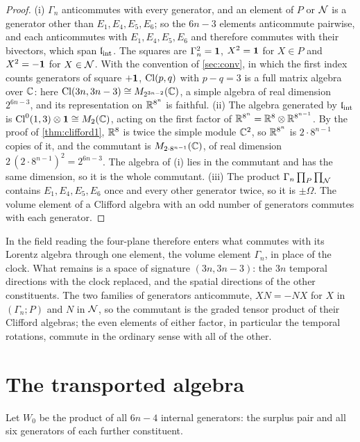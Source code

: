 \begin{proof}
(i) $\Gamma_n$ anticommutes with every generator, and an element of $P$ or $\mathcal N$ is a generator other than $E_1,E_4,E_5,E_6$; so the $6n-3$
elements anticommute pairwise, and each anticommutes with $E_1,E_4,E_5,E_6$ and therefore commutes with their bivectors, which span
$\mathfrak l_{\rm int}$. The squares are $\Gamma_n^2=\mathbf 1$, $X^2=\mathbf 1$ for $X\in P$ and $X^2=-\mathbf 1$ for $X\in\mathcal N$. With the convention of \cref{sec:conv}, in
which the first index counts generators of square $+\mathbf 1$, $\mathrm{Cl}(p,q)$ with $p-q=3$ is a full matrix algebra over $\mathbb{C}$: here
$\mathrm{Cl}(3n,3n-3)\cong M_{2^{3n-2}}(\mathbb{C})$, a simple algebra of real dimension $2^{6n-3}$, and its representation on $\mathbb{R}^{8^n}$ is faithful.
(ii) The algebra generated by $\mathfrak l_{\rm int}$ is $\mathrm{Cl}^0(1,3)\otimes\mathbf 1\cong M_2(\mathbb{C})$, acting on the first factor of $\mathbb{R}^{8^n}=\mathbb{R}^8\otimes\mathbb{R}^{8^{n-1}}$.
By the proof of \cref{thm:clifford1}, $\mathbb{R}^8$ is twice the simple module $\mathbb{C}^2$, so $\mathbb{R}^{8^n}$ is $2\cdot8^{n-1}$ copies of it, and the
commutant is $M_{2\cdot8^{n-1}}(\mathbb{C})$, of real dimension $2\,(2\cdot8^{n-1})^2=2^{6n-3}$. The algebra of (i) lies in the commutant and has
the same dimension, so it is the whole commutant.
(iii) The product $\Gamma_n\prod_P\prod_\mathcal N$ contains $E_1,E_4,E_5,E_6$ once and every other generator twice, so it is $\pm\Omega$. The volume
element of a Clifford algebra with an odd number of generators commutes with each generator.
\end{proof}

In the field reading the four-plane therefore enters what commutes with its Lorentz algebra through one element, the volume element
$\Gamma_n$, in place of the clock. What remains is a space of signature $(3n,3n-3)$: the $3n$ temporal directions with the clock replaced,
and the spatial directions of the other constituents. The two families of generators anticommute, $XN=-NX$ for $X$ in $(\Gamma_n;P)$ and $N$
in $\mathcal N$, so the commutant is the graded tensor product of their Clifford algebras; the even elements of either factor, in particular the
temporal rotations, commute in the ordinary sense with all of the other.

\section{The transported algebra}

Let $W_0$ be the product of all $6n-4$ internal generators: the surplus pair and all six generators of each further constituent.

